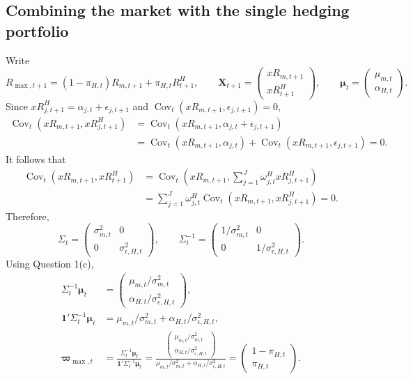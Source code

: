 \documentclass[11pt]{article}
\newcommand{\Ct}{\operatorname{Cov}_t}
\begin{document}
\subsection*{Combining the market with the single hedging portfolio}
Write
\[
R_{\max,t+1}=(1-\pi_{H,t})R_{m,t+1}+\pi_{H,t}R^H_{t+1},
\qquad
\mathbf X_{t+1}=\begin{pmatrix}xR_{m,t+1}\\xR^H_{t+1}\end{pmatrix},
\qquad
\boldsymbol\mu_t=\begin{pmatrix}\mu_{m,t}\\\alpha_{H,t}\end{pmatrix}.
\]
Since $xR^H_{j,t+1}=\alpha_{j,t}+\epsilon_{j,t+1}$ and
$\Ct(xR_{m,t+1},\epsilon_{j,t+1})=0$,
\begin{align*}
\Ct(xR_{m,t+1},xR^H_{j,t+1})
&=\Ct(xR_{m,t+1},\alpha_{j,t}+\epsilon_{j,t+1})\\
&=\Ct(xR_{m,t+1},\alpha_{j,t})
+\Ct(xR_{m,t+1},\epsilon_{j,t+1})=0.
\end{align*}
It follows that
\begin{align*}
\Ct(xR_{m,t+1},xR^H_{t+1})
&=\Ct\left(xR_{m,t+1},\sum_{j=1}^J\omega^H_{j,t}xR^H_{j,t+1}\right)\\
&=\sum_{j=1}^J\omega^H_{j,t}\Ct(xR_{m,t+1},xR^H_{j,t+1})=0.
\end{align*}
Therefore,
\[
\Sigma_t=\begin{pmatrix}\sigma^2_{m,t}&0\\0&\sigma^2_{\epsilon,H,t}\end{pmatrix},
\qquad
\Sigma_t^{-1}=\begin{pmatrix}1/\sigma^2_{m,t}&0\\0&1/\sigma^2_{\epsilon,H,t}\end{pmatrix}.
\]
Using Question 1(c),
\begin{align*}
\Sigma_t^{-1}\boldsymbol\mu_t
&=\begin{pmatrix}\mu_{m,t}/\sigma^2_{m,t}\\\alpha_{H,t}/\sigma^2_{\epsilon,H,t}\end{pmatrix},\\
\mathbf1'\Sigma_t^{-1}\boldsymbol\mu_t
&=\mu_{m,t}/\sigma^2_{m,t}+\alpha_{H,t}/\sigma^2_{\epsilon,H,t},\\
\boldsymbol\varpi_{\max,t}
&=\frac{\Sigma_t^{-1}\boldsymbol\mu_t}{\mathbf1'\Sigma_t^{-1}\boldsymbol\mu_t}
=\frac{\begin{pmatrix}\mu_{m,t}/\sigma^2_{m,t}\\\alpha_{H,t}/\sigma^2_{\epsilon,H,t}\end{pmatrix}}
{\mu_{m,t}/\sigma^2_{m,t}+\alpha_{H,t}/\sigma^2_{\epsilon,H,t}}
=\begin{pmatrix}1-\pi_{H,t}\\\pi_{H,t}\end{pmatrix}.
\end{align*}
\end{document}
